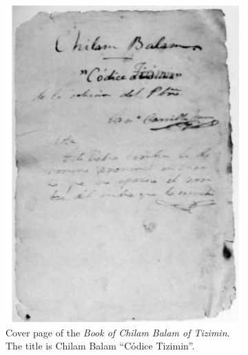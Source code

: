 \documentclass[../main.tex]{subfiles}
\begin{document}
\begin{figure}
    \centering
    \begin{subfigure}[b]{0.49\textwidth}
        \centering
        \includegraphics[width=\textwidth]{img/chilam-balam-of-tizimin-cover-page}
        \caption{Cover page of the \emph{Book of Chilam Balam of Tizimin}. 
                 The title is Chilam Balam ``C\'odice Tizimin''.}
        \label{fig:introduction-chilam-balam-of-tizimin-cover-page}
    \end{subfigure}
    \hfill
    \begin{subfigure}[b]{0.49\textwidth}
        \centering

\end{subfigure}
\end{figure}
\end{document}
